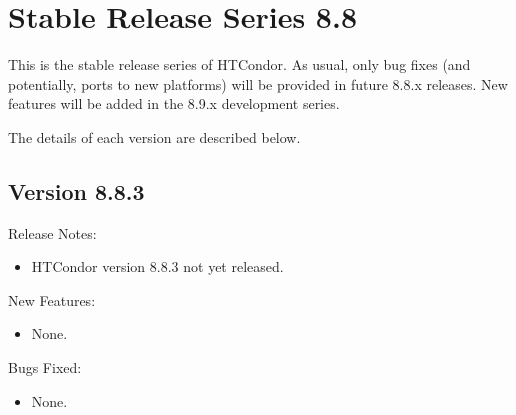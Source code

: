 
\section{Stable Release Series 8.8}\label{sec:History-8-8}

This is the stable release series of HTCondor.
As usual, only bug fixes (and potentially, ports to new platforms)
will be provided in future 8.8.x releases.
New features will be added in the 8.9.x development series.

The details of each version are described below.

\subsection*{\label{sec:New-8-8-3}Version 8.8.3}

\noindent Release Notes:

\begin{itemize}

\item HTCondor version 8.8.3 not yet released.

\end{itemize}


\noindent New Features:

\begin{itemize}

\item None.

\end{itemize}

\noindent Bugs Fixed:

\begin{itemize}

\item None.

\end{itemize}

